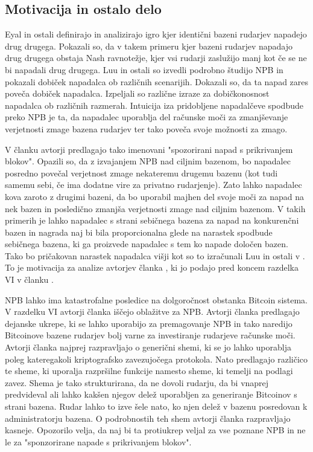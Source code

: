 \documentclass{acm_proc_article-sp}
\begin{document}
\subsection{Motivacija in ostalo delo}

Eyal \cite{minnersdilemma} in ostali definirajo in analizirajo igro kjer identični bazeni rudarjev napadejo drug drugega. Pokazali so, da v takem primeru kjer bazeni rudarjev napadajo drug drugega obstaja Nash ravnotežje, kjer vsi rudarji zaslužijo manj kot če se ne bi napadali drug drugega. Luu in ostali \cite{powersplitting} so izvedli podrobno študijo NPB in pokazali dobiček napadalca ob različnih scenarijih. Dokazali so, da ta napad zares poveča dobiček napadalca. Izpeljali so različne izraze za dobičkonosnost napadalca ob različnih razmerah. Intuicija iza pridobljene napadalčeve spodbude preko NPB je ta, da napadalec uporablja del računske moči za zmanjševanje verjetnosti zmage bazena rudarjev ter tako poveča svoje možnosti za zmago.

V članku \cite{originalarticle} avtorji predlagajo tako imenovani "spozorirani napad s prikrivanjem blokov". Opazili so, da z izvajanjem NPB nad ciljnim bazenom, bo napadalec posredno povečal verjetnost zmage nekateremu drugemu bazenu (kot tudi samemu sebi, če ima dodatne vire za privatno rudarjenje). Zato lahko napadalec kova zaroto z drugimi bazeni, da bo uporabil majhen del svoje moči za napad na nek bazen in posledično zmanjša verjetnosti zmage nad ciljnim bazenom. V takih primerih je lahko napadalec s strani sebičnega bazena za napad na konkurenčni bazen in nagrada naj bi bila proporcionalna glede na narastek spodbude sebičnega bazena, ki ga proizvede napadalec s tem ko napade določen bazen. Tako bo pričakovan narastek napadalca višji kot so to izračunali Luu in ostali v \cite{powersplitting}. To je motivacija za analize avtorjev članka \cite{originalarticle}, ki jo podajo pred koncem razdelka VI v članku \cite{originalarticle}.


NPB lahko ima katastrofalne posledice na dolgoročnost obstanka Bitcoin sistema. V razdelku VI avtorji članka \cite{originalarticle} iščejo oblažitve za NPB. Avtorji članka \cite{originalarticle} predlagajo dejanske ukrepe, ki se lahko uporabijo za premagovanje NPB in tako naredijo Bitcoinove bazene rudarjev bolj varne za investiranje rudarjeve računske moči. Avtorji članka \cite{originalarticle} najprej razpravljajo o generični shemi, ki se jo lahko uporablja poleg kateregakoli kriptografsko zavezujočega protokola. Nato predlagajo različico te sheme, ki uporalja razpršilne funkcije namesto sheme, ki temelji na podlagi zavez. Shema je tako strukturirana, da ne dovoli rudarju, da bi vnaprej predvideval ali lahko kakšen njegov delež uporabljen za generiranje Bitcoinov s strani bazena. Rudar lahko to izve šele nato, ko njen delež v bazenu posredovan k administratorju bazena. O podrobnostih teh shem avtorji članka \cite{originalarticle} razpravljajo kasneje. Opozorilo velja, da naj bi ta protiukrep veljal za vse poznane NPB in ne le za "sponzorirane napade s prikrivanjem blokov".
\end{document}
